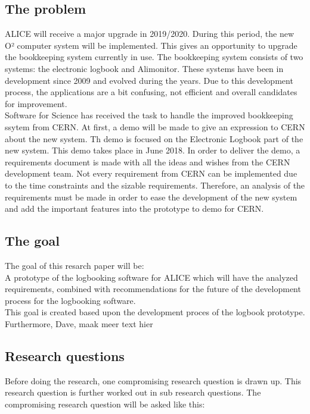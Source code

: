 \documentclass[paper=a4, fontsize=11pt,twoside]{scrartcl}	%
\begin{document}
\subsection{The problem}
ALICE will receive a major upgrade in 2019/2020. During this period, the new O² computer system will be implemented. This gives an opportunity to upgrade the bookkeeping system currently in use. The bookkeeping system consists of two systems: the electronic logbook and Alimonitor. These systems have been in development since 2009 and evolved during the years. Due to this development process, the applications are a bit confusing, not efficient and overall candidates for improvement. \\
Software for Science has received the task to handle the improved bookkeeping ssytem from CERN. At first, a demo will be made to give an expression to CERN about the new system. Th demo is focused on the Electronic Logbook part of the new system. This demo takes place in June 2018. In order to deliver the demo, a requirements document is made with all the ideas and wishes from the CERN development team. Not every requirement from CERN can be implemented due to the time constraints and the sizable requirements. Therefore, an analysis of the requirements must be made in order to ease the development of the new system and add the important features into the prototype to demo for CERN.

\subsection{The goal}
The goal of this resarch paper will be: \\

A prototype of the logbooking software for ALICE which will have the analyzed requirements, combined with recommendations for the future of the development process for the logbooking software. \\

This goal is created based upon the development proces of the logbook prototype. Furthermore, Dave, maak meer text hier 

\subsection{Research questions}
Before doing the research, one compromising research question is drawn up. This research question is further worked out in sub research questions. The compromising research question will be asked like this: 
\end{document}
